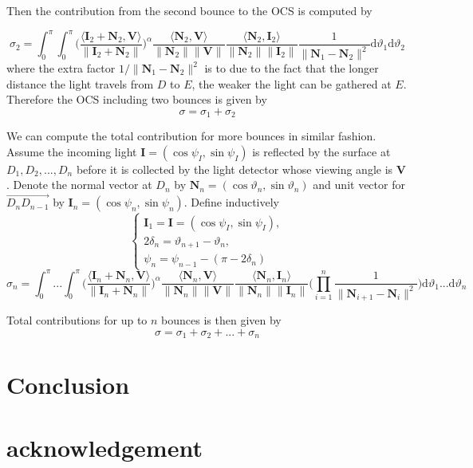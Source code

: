 \documentclass[11pt]{amsart}
\newcommand{\ip}[2]{\langle {#1}, {#2} \rangle}
\theoremstyle{definition}
\begin{document}
Then the contribution from the second bounce to the OCS is computed by

$$\sigma_2 =\int_{0}^{\pi}\int_{0}^{\pi}\Bigg(\frac{\ip{\mathbf{I}_2+\mathbf{N}_2}{\mathbf{V}}}{\|\mathbf{I}_2+\mathbf{N}_2\|}\Bigg)^\alpha\frac{\ip{\mathbf{N}_2}{\mathbf{V}}}{\|\mathbf{N}_2\| \|\mathbf{V}\|}\frac{\ip{\mathbf{N}_2}{\mathbf{I}_2}}{\|\mathbf{N}_2\| \|\mathbf{I}_2\|} \frac{1}{\|\mathbf{N}_1-\mathbf{N}_2\|^2}\mathrm{d}\vartheta_1\mathrm{d}\vartheta_2$$
where the extra factor  $1/\|\mathbf{N}_1-{\mathbf{N}}_2\|^2$ is to due to the fact that the longer distance the light travels from $D$ to $E$, the weaker the light can be gathered at $E$.  Therefore the OCS including two bounces is given by $$\sigma=\sigma_1+\sigma_2$$

We can compute the total contribution for more bounces in similar fashion. Assume the incoming light $\mathbf{I}=(\cos\psi_{I},\sin\psi_{I})$ is reflected by the surface at $D_1,D_2,...,D_n$ before it is collected by the light detector whose viewing angle is $\mathbf{V}$. Denote the normal vector at $D_n$ by $\mathbf{N}_n=(\cos\vartheta_n,\sin\vartheta_n)$ and unit vector for $\overrightarrow{D_{n}D_{n-1}}$ by $\mathbf{I}_n=(\cos\psi_n,\sin\psi_n)$. Define inductively 
$$\begin{cases}\mathbf{I}_1=\mathbf{I}=(\cos\psi_{I},\sin\psi_{I}),\\ 2\delta_n=\vartheta_{n+1}-\vartheta_n,\\ \psi_n=\psi_{n-1}-(\pi-2\delta_n)\end{cases}$$ 
$$\sigma_n =\int_{0}^{\pi}...\int_{0}^{\pi}\Bigg(\frac{\ip{\mathbf{I}_n+\mathbf{N}_n}{\mathbf{V}}}{\|\mathbf{I}_n+\mathbf{N}_n\|}\Bigg)^\alpha\frac{\ip{\mathbf{N}_n}{\mathbf{V}}}{\|\mathbf{N}_n\| \|\mathbf{V}\|}\frac{\ip{\mathbf{N}_n}{\mathbf{I}_n}}{\|\mathbf{N}_n\| \|\mathbf{I}_n\|} \bigg(\prod_{i=1}^{n}\frac{1}{\|\mathbf{N}_{i+1}-\mathbf{N}_{i}\|^2} \bigg)\mathrm{d}\vartheta_1...\mathrm{d}\vartheta_n$$

Total contributions for up to $n$ bounces is then given by
 $$ \sigma= \sigma_1+\sigma_2+...+\sigma_n$$
\section{Conclusion}
\section{acknowledgement}
\end{document}
